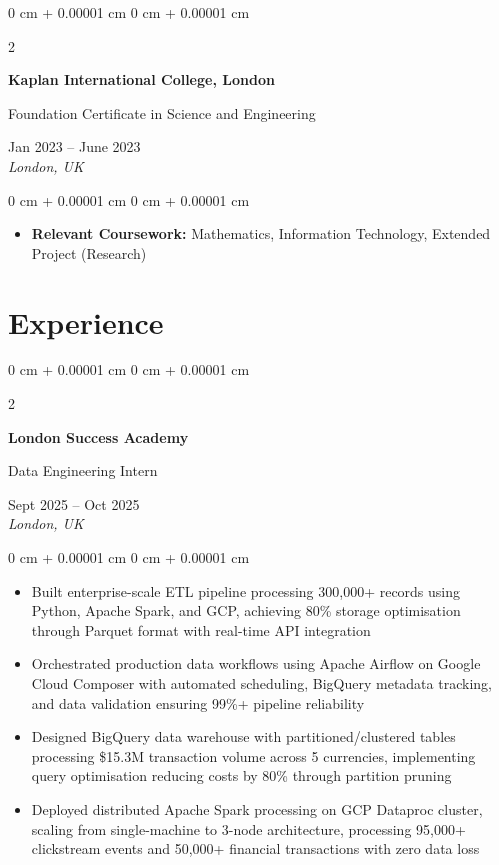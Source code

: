 \documentclass[10pt, a4paper]{article}
\newenvironment{highlights}{
    \begin{itemize}[
        topsep=0.10 cm,
        parsep=0.10 cm,
        partopsep=0pt,
        itemsep=0pt,
        leftmargin=20pt
    ]
}{
    \end{itemize}
} %
\newenvironment{onecolentry}{
    \begin{adjustwidth}{
        0 cm + 0.00001 cm
    }{
        0 cm + 0.00001 cm
    }
}{
    \end{adjustwidth}
} %
\newenvironment{twocolentry}[2][]{
    \onecolentry
    \def\secondColumn{#2}
    \setcolumnwidth{\fill, 4.5 cm}
    \begin{paracol}{2}
}{
    \switchcolumn \raggedleft \secondColumn
    \end{paracol}
    \endonecolentry
} %
\begin{document}
    \begin{twocolentry}{
        Jan 2023 -- June 2023 \\
        \textit{London, UK}
    }
        \textbf{Kaplan International College, London}

        Foundation Certificate in Science and Engineering 
    \end{twocolentry}

    \vspace{0.10 cm}
    \begin{onecolentry}
        \begin{highlights}
            \item \textbf{Relevant Coursework:} Mathematics, Information Technology, Extended Project (Research)
        \end{highlights}
    \end{onecolentry}


    \section{Experience}

    \begin{twocolentry}{
        Sept 2025 -- Oct 2025 \\
        \textit{London, UK}
    }
        \textbf{London Success Academy}
        
        Data Engineering Intern
    \end{twocolentry}

    \vspace{0.10 cm}
    \begin{onecolentry}
        \begin{highlights}
            \item Built enterprise-scale ETL pipeline processing 300,000+ records using Python, Apache Spark, and GCP, achieving 80\% storage optimisation through Parquet format with real-time API integration
            \item Orchestrated production data workflows using Apache Airflow on Google Cloud Composer with automated scheduling, BigQuery metadata tracking, and data validation ensuring 99\%+ pipeline reliability
            \item Designed BigQuery data warehouse with partitioned/clustered tables processing \$15.3M transaction volume across 5 currencies, implementing query optimisation reducing costs by 80\% through partition pruning
            \item Deployed distributed Apache Spark processing on GCP Dataproc cluster, scaling from single-machine to 3-node architecture, processing 95,000+ clickstream events and 50,000+ financial transactions with zero data loss
        \end{highlights}
    \end{onecolentry}
\end{document}
